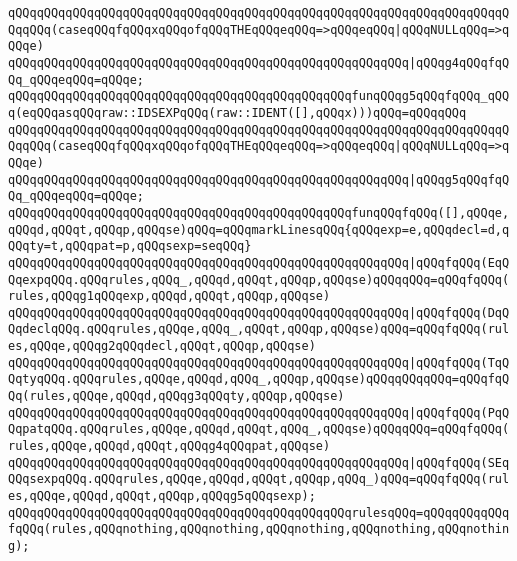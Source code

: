 \verb|qQQqqQQqqQQqqQQqqQQqqQQqqQQqqQQqqQQqqQQqqQQqqQQqqQQqqQQqqQQqqQQqqQQqqQQqqQQq(caseqQQqfqQQqxqQQqofqQQqTHEqQQqeqQQq=>qQQqeqQQq|\verb#|qQQqNULLqQQq=>qQQqe)#\newline
\verb|qQQqqQQqqQQqqQQqqQQqqQQqqQQqqQQqqQQqqQQqqQQqqQQqqQQqqQQq|\verb#|qQQqg4qQQqfqQQq_qQQqeqQQq=qQQqe;#\newline
\newline
\verb|qQQqqQQqqQQqqQQqqQQqqQQqqQQqqQQqqQQqqQQqqQQqqQQqfunqQQqg5qQQqfqQQq_qQQq(eqQQqasqQQqraw::IDSEXPqQQq(raw::IDENT([],qQQqx)))qQQq=qQQqqQQq|\newline
\verb|qQQqqQQqqQQqqQQqqQQqqQQqqQQqqQQqqQQqqQQqqQQqqQQqqQQqqQQqqQQqqQQqqQQqqQQqqQQq(caseqQQqfqQQqxqQQqofqQQqTHEqQQqeqQQq=>qQQqeqQQq|\verb#|qQQqNULLqQQq=>qQQqe)#\newline
\verb|qQQqqQQqqQQqqQQqqQQqqQQqqQQqqQQqqQQqqQQqqQQqqQQqqQQqqQQq|\verb#|qQQqg5qQQqfqQQq_qQQqeqQQq=qQQqe;#\newline
\newline
\verb|qQQqqQQqqQQqqQQqqQQqqQQqqQQqqQQqqQQqqQQqqQQqqQQqfunqQQqfqQQq([],qQQqe,qQQqd,qQQqt,qQQqp,qQQqse)qQQq=qQQqmarkLinesqQQq{qQQqexp=e,qQQqdecl=d,qQQqty=t,qQQqpat=p,qQQqsexp=seqQQq}|\newline
\verb|qQQqqQQqqQQqqQQqqQQqqQQqqQQqqQQqqQQqqQQqqQQqqQQqqQQqqQQq|\verb#|qQQqfqQQq(EqQQqexpqQQq.qQQqrules,qQQq_,qQQqd,qQQqt,qQQqp,qQQqse)qQQqqQQq=qQQqfqQQq(rules,qQQqg1qQQqexp,qQQqd,qQQqt,qQQqp,qQQqse)#\newline
\verb|qQQqqQQqqQQqqQQqqQQqqQQqqQQqqQQqqQQqqQQqqQQqqQQqqQQqqQQq|\verb#|qQQqfqQQq(DqQQqdeclqQQq.qQQqrules,qQQqe,qQQq_,qQQqt,qQQqp,qQQqse)qQQq=qQQqfqQQq(rules,qQQqe,qQQqg2qQQqdecl,qQQqt,qQQqp,qQQqse)#\newline
\verb|qQQqqQQqqQQqqQQqqQQqqQQqqQQqqQQqqQQqqQQqqQQqqQQqqQQqqQQq|\verb#|qQQqfqQQq(TqQQqtyqQQq.qQQqrules,qQQqe,qQQqd,qQQq_,qQQqp,qQQqse)qQQqqQQqqQQq=qQQqfqQQq(rules,qQQqe,qQQqd,qQQqg3qQQqty,qQQqp,qQQqse)#\newline
\verb|qQQqqQQqqQQqqQQqqQQqqQQqqQQqqQQqqQQqqQQqqQQqqQQqqQQqqQQq|\verb#|qQQqfqQQq(PqQQqpatqQQq.qQQqrules,qQQqe,qQQqd,qQQqt,qQQq_,qQQqse)qQQqqQQq=qQQqfqQQq(rules,qQQqe,qQQqd,qQQqt,qQQqg4qQQqpat,qQQqse)#\newline
\verb|qQQqqQQqqQQqqQQqqQQqqQQqqQQqqQQqqQQqqQQqqQQqqQQqqQQqqQQq|\verb#|qQQqfqQQq(SEqQQqsexpqQQq.qQQqrules,qQQqe,qQQqd,qQQqt,qQQqp,qQQq_)qQQq=qQQqfqQQq(rules,qQQqe,qQQqd,qQQqt,qQQqp,qQQqg5qQQqsexp);#\newline
\newline
\verb|qQQqqQQqqQQqqQQqqQQqqQQqqQQqqQQqqQQqqQQqqQQqqQQqrulesqQQq=qQQqqQQqqQQqfqQQq(rules,qQQqnothing,qQQqnothing,qQQqnothing,qQQqnothing,qQQqnothing);|\newline
